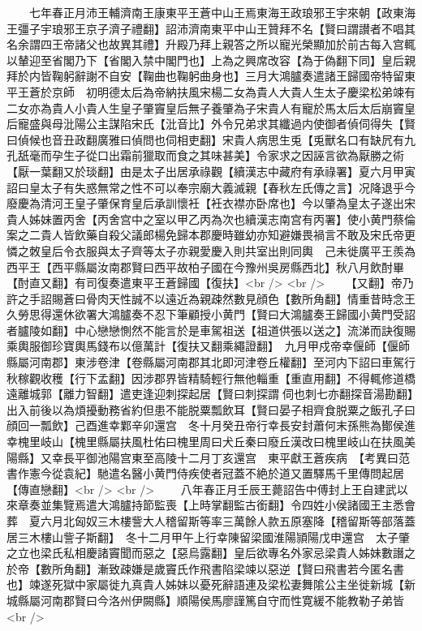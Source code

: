 　　七年春正月沛王輔濟南王康東平王蒼中山王焉東海王政琅邪王宇來朝【政東海王彊子宇琅邪王京子濟子禮翻】詔沛濟南東平中山王贊拜不名【賢曰謂讃者不唱其名余謂四王帝諸父也故異其禮】升殿乃拜上親答之所以寵光榮顯加於前古每入宫輒以輦迎至省閣乃下【省閣入禁中閣門也】上為之興席改容【為于偽翻下同】皇后親拜於内皆鞠躬辭謝不自安【鞠曲也鞠躬曲身也】三月大鴻臚奏遣諸王歸國帝特留東平王蒼於京師　初明德太后為帝納扶風宋楊二女為貴人大貴人生太子慶梁松弟竦有二女亦為貴人小貴人生皇子肇竇皇后無子養肇為子宋貴人有寵於馬太后太后崩竇皇后寵盛與母沘陽公主謀陷宋氏【沘音比】外令兄弟求其纖過内使御者偵伺得失【賢曰偵候也音丑政翻廣雅曰偵問也伺相吏翻】宋貴人病思生兎【兎獸名口有缺凥有九孔舐毫而孕生子從口出霜前獵取而食之其味甚美】令家求之因誣言欲為厭勝之術【厭一葉翻又於琰翻】由是太子出居承祿觀【續漢志中藏府有承祿署】夏六月甲寅詔曰皇太子有失惑無常之性不可以奉宗廟大義滅親【春秋左氏傳之言】况降退乎今廢慶為清河王皇子肇保育皇后承訓懷衽【衽衣襟亦卧席也】今以肇為皇太子遂出宋貴人姊妹置丙舍【丙舍宫中之室以甲乙丙為次也續漢志南宫有丙署】使小黄門蔡倫案之二貴人皆飲藥自殺父議郎楊免歸本郡慶時雖幼亦知避嫌畏禍言不敢及宋氏帝更憐之敇皇后令衣服與太子齊等太子亦親愛慶入則共室出則同輿　己未徙廣平王羨為西平王【西平縣屬汝南郡賢曰西平故柏子國在今豫州吳房縣西北】秋八月飲酎畢【酎直又翻】有司復奏遣東平王蒼歸國【復扶】<br />
<br />
　　【又翻】帝乃許之手詔賜蒼曰骨肉天性誠不以遠近為親疎然數見顔色【數所角翻】情重昔時念王久勞思得還休欲署大鴻臚奏不忍下筆顧授小黄門【賢曰大鴻臚奏王歸國小黄門受詔者臚陵如翻】中心戀戀惻然不能言於是車駕祖送【祖道供張以送之】流涕而訣復賜乘輿服御珍寶輿馬錢布以億萬計【復扶又翻乘繩證翻】　九月甲戍帝幸偃師【偃師縣屬河南郡】東涉卷津【卷縣屬河南郡其北即河津卷丘權翻】至河内下詔曰車駕行秋稼觀收穫【行下孟翻】因涉郡界皆精騎輕行無他輜重【重直用翻】不得輒修道橋遠離城郭【離力智翻】遣吏逢迎刺探起居【賢曰刺探謂伺也刺七亦翻探音湯勘翻】出入前後以為煩擾動務省約但患不能脱粟瓢飲耳【賢曰晏子相齊食脱粟之飯孔子曰顔回一瓢飲】己酉進幸鄴辛卯還宫　冬十月癸丑帝行幸長安封蕭何末孫熊為鄼侯進幸槐里岐山【槐里縣屬扶風杜佑曰槐里周曰犬丘秦曰廢丘漢改曰槐里岐山在扶風美陽縣】又幸長平御池陽宫東至高陵十二月丁亥還宫　東平獻王蒼疾病　【考異曰范書作憲今從袁紀】馳遣名醫小黄門侍疾使者冠蓋不絶於道又置驛馬千里傳問起居【傳直戀翻】<br />
<br />
　　八年春正月壬辰王薨詔告中傅封上王自建武以來章奏並集覽焉遣大鴻臚持節監喪【上時掌翻監古銜翻】令四姓小侯諸國王主悉會葬　夏六月北匈奴三木樓訾大人稽留斯等率三萬餘人款五原塞降【稽留斯等部落蓋居三木樓山訾子斯翻】　冬十二月甲午上行幸陳留梁國淮陽頴陽戊申還宫　太子肇之立也梁氏私相慶諸竇聞而惡之【惡烏露翻】皇后欲專名外家忌梁貴人姊妹數譖之於帝【數所角翻】漸致疎嫌是歲竇氏作飛書陷梁竦以惡逆【賢曰飛書若今匿名書也】竦遂死獄中家屬徙九真貴人姊妹以憂死辭語連及梁松妻舞隂公主坐徙新城【新城縣屬河南郡賢曰今洛州伊闕縣】順陽侯馬廖謹篤自守而性寛緩不能教勒子弟皆<br />
